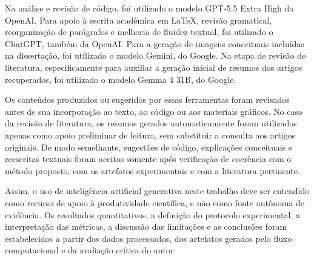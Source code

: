 Na análise e revisão de código, foi utilizado o modelo GPT-5.5 Extra High da
OpenAI. Para apoio à escrita acadêmica em \LaTeX{}, revisão gramatical,
reorganização de parágrafos e melhoria de fluidez textual, foi utilizado o
ChatGPT, também da OpenAI. Para a geração de imagens conceituais incluídas na
dissertação, foi utilizado o modelo Gemini, do Google. Na etapa de revisão de
literatura, especificamente para auxiliar a geração inicial de resumos dos
artigos recuperados, foi utilizado o modelo Gemma 4 31B, do Google.

Os conteúdos produzidos ou sugeridos por essas ferramentas foram revisados antes
de sua incorporação ao texto, ao código ou aos materiais gráficos. No caso da
revisão de literatura, os resumos gerados automaticamente foram utilizados
apenas como apoio preliminar de leitura, sem substituir a consulta aos artigos
originais. De modo semelhante, sugestões de código, explicações conceituais e
reescritas textuais foram aceitas somente após verificação de coerência com o
método proposto, com os artefatos experimentais e com a literatura pertinente.

Assim, o uso de inteligência artificial generativa neste trabalho deve ser
entendido como recurso de apoio à produtividade científica, e não como fonte
autônoma de evidência. Os resultados quantitativos, a definição do protocolo
experimental, a interpretação das métricas, a discussão das limitações e as
conclusões foram estabelecidos a partir dos dados processados, dos artefatos
gerados pelo fluxo computacional e da avaliação crítica do autor.
